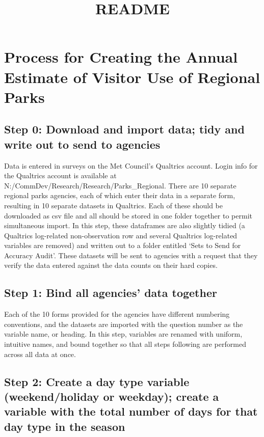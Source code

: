 \documentclass[]{article}
\title{README}
\author{}
\date{}
\begin{document}
\maketitle

\section{Process for Creating the Annual Estimate of Visitor Use of
Regional
Parks}\label{process-for-creating-the-annual-estimate-of-visitor-use-of-regional-parks}

\subsection{Step 0: Download and import data; tidy and write out to send
to
agencies}\label{step-0-download-and-import-data-tidy-and-write-out-to-send-to-agencies}

Data is entered in surveys on the Met Council's Qualtrics account. Login
info for the Qualtrics account is available at
N:/CommDev/Research/Research/Parks\_Regional. There are 10 separate
regional parks agencies, each of which enter their data in a separate
form, resulting in 10 separate datasets in Qualtrics. Each of these
should be downloaded as csv file and all should be stored in one folder
together to permit simultaneous import. In this step, these dataframes
are also slightly tidied (a Qualtrics log-related non-observation row
and several Qualtrics log-related variables are removed) and written out
to a folder entitled `Sets to Send for Accuracy Audit'. These datasets
will be sent to agencies with a request that they verify the data
entered against the data counts on their hard copies.

\subsection{Step 1: Bind all agencies' data
together}\label{step-1-bind-all-agencies-data-together}

Each of the 10 forms provided for the agencies have different numbering
conventions, and the datasets are imported with the question number as
the variable name, or heading. In this step, variables are renamed with
uniform, intuitive names, and bound together so that all steps following
are performed across all data at once.

\subsection{Step 2: Create a day type variable (weekend/holiday or
weekday); create a variable with the total number of days for that day
type in the
season}\label{step-2-create-a-day-type-variable-weekendholiday-or-weekday-create-a-variable-with-the-total-number-of-days-for-that-day-type-in-the-season}
\end{document}
